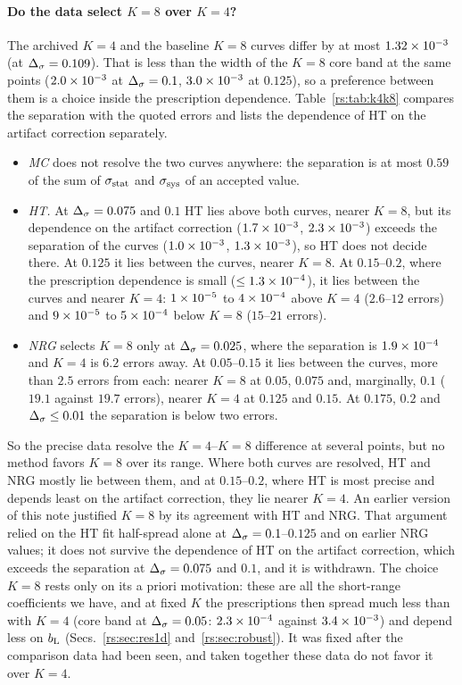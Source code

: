 \paragraph{Do the data select $K=8$ over $K=4$?} The archived $K=4$ and the baseline $K=8$
curves differ by at most $1.32\times10^{-3}$ (at $\Delta_\sigma=0.109$). That is less than the width of the
$K=8$ core band at the same points ($2.0\times10^{-3}$ at $\Delta_\sigma=0.1$, $3.0\times10^{-3}$ at $0.125$), so a
preference between them is a choice inside the prescription dependence.
Table~\ref{rs:tab:k4k8} compares the separation with the quoted errors and lists the dependence of
HT on the artifact correction separately.
\begin{itemize}
\item \emph{MC} does not resolve the two curves anywhere: the separation is at most $0.59$
of the sum of $\sigma_{\rm stat}$ and $\sigma_{\rm sys}$ of an accepted value.
\item \emph{HT.} At $\Delta_\sigma=0.075$ and $0.1$ HT lies above both curves, nearer $K=8$, but its
dependence on the artifact correction ($1.7\times10^{-3}$, $2.3\times10^{-3}$) exceeds the separation of the curves
($1.0\times10^{-3}$, $1.3\times10^{-3}$), so HT does not decide there. At $0.125$ it lies between the
curves, nearer $K=8$. At $0.15$--$0.2$, where the prescription dependence is small
($\le1.3\times10^{-4}$), it lies between the curves and nearer $K=4$: $1\times10^{-5}$ to $4\times10^{-4}$
above $K=4$ ($2.6$--$12$ errors) and $9\times10^{-5}$ to $5\times10^{-4}$ below $K=8$ ($15$--$21$ errors).
\item \emph{NRG} selects $K=8$ only at $\Delta_\sigma=0.025$, where the separation is $1.9\times10^{-4}$ and
$K=4$ is $6.2$ errors away. At $0.05$--$0.15$ it lies between the curves, more than $2.5$
errors from each: nearer $K=8$ at $0.05$, $0.075$ and, marginally, $0.1$ ($19.1$ against
$19.7$ errors), nearer $K=4$ at $0.125$ and $0.15$. At $0.175$, $0.2$ and $\Delta_\sigma\le0.01$ the separation is below two errors.
\end{itemize}
So the precise data resolve the $K=4$--$K=8$ difference at several points, but no method
favors $K=8$ over its range. Where both curves are resolved, HT and NRG mostly lie between
them, and at $0.15$--$0.2$, where HT is most precise and depends least on the artifact
correction, they lie nearer $K=4$. An earlier version of this note justified $K=8$ by its
agreement with HT and NRG. That argument relied on the HT fit half-spread alone at
$\Delta_\sigma=0.1$--$0.125$ and on earlier NRG values; it does not survive the dependence of HT on the
artifact correction, which exceeds the separation at $\Delta_\sigma=0.075$ and $0.1$, and it is
withdrawn. The choice $K=8$ rests only on its a priori motivation: these are all the
short-range coefficients we have, and at fixed $K$ the prescriptions then spread much less
than with $K=4$ (core band at $\Delta_\sigma=0.05$: $2.3\times10^{-4}$ against $3.4\times10^{-3}$) and depend
less on $b_{\mathrm L}$ (Secs.~\ref{rs:sec:res1d} and~\ref{rs:sec:robust}). It was fixed after the comparison
data had been seen, and taken together these data do not favor it over $K=4$.

